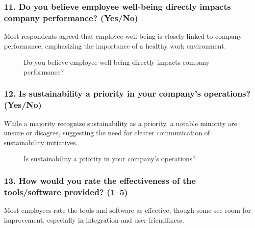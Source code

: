\subsubsection*{11. Do you believe employee well-being directly impacts company performance? (Yes/No)}

Most respondents agreed that employee well-being is closely linked to company performance, emphasizing the importance of a healthy work environment.

\begin{figure}[H]
    \centering
    \caption{Do you believe employee well-being directly impacts company performance?}
    \label{fig:wellbeing_performance}
\end{figure}

\subsubsection*{12. Is sustainability a priority in your company's operations? (Yes/No)}

While a majority recognize sustainability as a priority, a notable minority are unsure or disagree, suggesting the need for clearer communication of sustainability initiatives.

\begin{figure}[H]
    \centering
    \caption{Is sustainability a priority in your company's operations?}
    \label{fig:sustainability}
\end{figure}

\subsubsection*{13. How would you rate the effectiveness of the tools/software provided? (1--5)}

Most employees rate the tools and software as effective, though some see room for improvement, especially in integration and user-friendliness.


